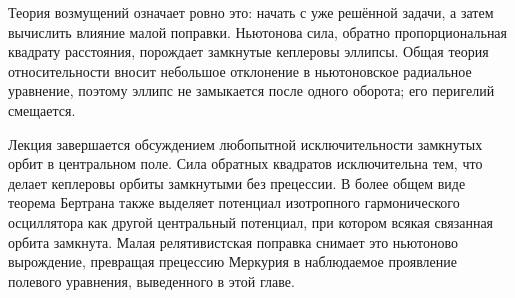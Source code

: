 Теория возмущений означает ровно это: начать с уже решённой задачи, а затем вычислить влияние малой поправки. Ньютонова сила, обратно пропорциональная квадрату расстояния, порождает замкнутые кеплеровы эллипсы. Общая теория относительности вносит небольшое отклонение в ньютоновское радиальное уравнение, поэтому эллипс не замыкается после одного оборота; его перигелий смещается.

Лекция завершается обсуждением любопытной исключительности замкнутых орбит в центральном поле. Сила обратных квадратов исключительна тем, что делает кеплеровы орбиты замкнутыми без прецессии. В более общем виде теорема Бертрана также выделяет потенциал изотропного гармонического осциллятора как другой центральный потенциал, при котором всякая связанная орбита замкнута. Малая релятивистская поправка снимает это ньютоново вырождение, превращая прецессию Меркурия в наблюдаемое проявление полевого уравнения, выведенного в этой главе.